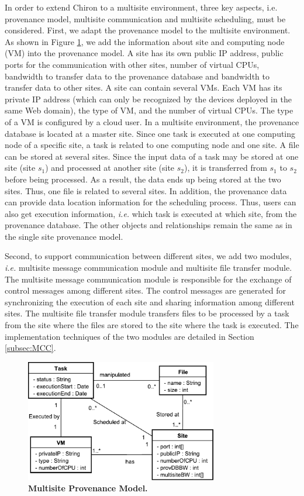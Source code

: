 In order to extend Chiron to a multisite environment, three key aspects, i.e. provenance model, multisite communication and multisite scheduling, must be considered.
First, we adapt the provenance model to the multisite environment. As shown in Figure \ref{fig:MProv}, we add the information about site and computing node (VM) into the provenance model. A site has its own public IP address, public ports for the communication with other sites, number of virtual CPUs, bandwidth to transfer data to the provenance database and bandwidth to transfer data to other sites. A site can contain several VMs. Each VM has its private IP address (which can only be recognized by the devices deployed in the same Web domain), the type of VM, and the number of virtual CPUs. The type of a VM is configured by a cloud user. In a multisite environment, the provenance database is located at a master site. Since one task is executed at one computing node of a specific site, a task is related to one computing node and one site. A file can be stored at several sites. Since the input data of a task may be stored at one site (site $s_1$) and processed at another site (site $s_2$), it is transferred from $s_1$ to $s_2$ before being processed. As a result, the data ends up being stored at the two sites. Thus, one file is related to several sites. In addition, the provenance data can provide data location information for the scheduling process. Thus, users can also get execution information, \textit{i.e.} which task is executed at which site, from the provenance database. The other objects and relationships remain the same as in the single site provenance model.

Second, to support communication between different sites, we add two modules, \textit{i.e.} multisite message communication module and multisite file transfer module. The multisite message communication module is responsible for the exchange of control messages among different sites. The control messages are generated for synchronizing the execution of each site and sharing information among different sites. The multisite file transfer module transfers files to be processed by a task from the site where the files are stored to the site where the task is executed.
The implementation techniques of the two modules are detailed in Section \ref{subsec:MCC}.

\begin{figure}
\begin{centering}
\captionsetup{justification=centering}
\includegraphics[width=84mm]{figures/MProv}
\par\end{centering}
\caption{\textbf{Multisite Provenance Model.}}
\label{fig:MProv}
\end{figure}

